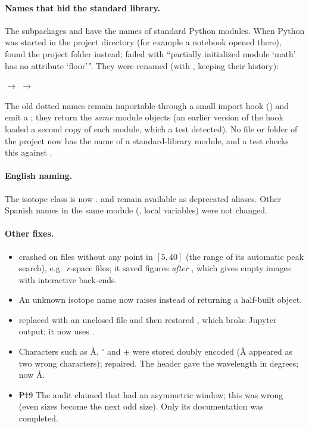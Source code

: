 \documentclass[11pt,a4paper]{article}
\begin{document}
\paragraph{ Names that hid the standard library.} The
subpackages  and  have the names of standard Python
modules. When Python was started in the project directory (for example a
notebook opened there),  found the project folder
instead;  failed with ``partially initialized module
`math' has no attribute `floor'''. They were renamed (with ,
keeping their history):
\begin{center}
 $\to$  \qquad
{} $\to$ 
\end{center}
The old dotted names remain importable through a small import hook
() and emit a ; they return the
\emph{same} module objects (an earlier version of the hook loaded a second
copy of each module, which a test detected). No file or folder of the
project now has the name of a standard-library module, and a test checks
this against .

\paragraph{English naming.} The isotope class  is now
.  and  remain available as
deprecated aliases. Other Spanish names in the same module
(, local variables) were not changed.

\paragraph{Other fixes.}
\begin{itemize}
  \item {}  crashed on files without any point in
    $[5,40]$ (the range of its automatic peak search), e.g.\ $r$-space
    files; it saved figures \emph{after} , which gives
    empty images with interactive back-ends.
  \item {} An unknown isotope name now raises 
    instead of returning a half-built object.
  \item {}  replaced 
    with an unclosed file and then restored , which
    broke Jupyter output; it now uses .
  \item {} Characters such as \AA, $^\circ$ and $\pm$ were stored
    doubly encoded (\AA{} appeared as two wrong characters); repaired.  The 
    header gave the wavelength in degrees; now \AA.
  \item \st{P19} The audit claimed that  had an
    asymmetric window; this was wrong (even sizes become the next odd
    size). Only its documentation was completed.
\end{itemize}
\end{document}

